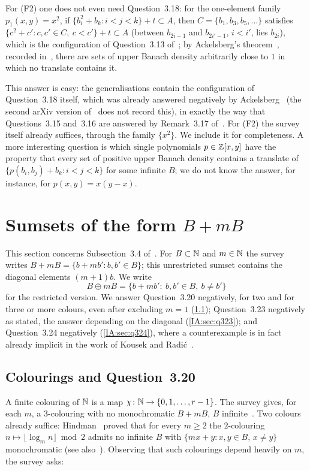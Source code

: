 For (F2) one does not even need Question~3.18: for the one-element family $p_1(x,y)=x^2$, if
$\{b_i^2+b_k:i<j<k\}+t\subset A$, then $C=\{b_1,b_3,b_5,\dots\}$ satisfies
$\{c^2+c':c,c'\in C,\ c<c'\}+t\subset A$ (between $b_{2i-1}$ and $b_{2i'-1}$, $i<i'$, lies $b_{2i}$),
which is the configuration of Question~3.13 of~\cite{kra2023problems}; by Ackelsberg's
theorem~\cite[Theorem~1.5]{ackelsberg2024counterexamples}, recorded in~\cite{kra2023problems},
there are sets of upper Banach density arbitrarily close to $1$ in which no translate contains it.

\begin{remark}\label{IA:rem:u33e}
This answer is easy: the generalisations contain the configuration of Question~3.18 itself, which
was already answered negatively by Ackelsberg~\cite[Theorem~1.7]{ackelsberg2024counterexamples}
(the second arXiv version of~\cite{kra2023problems} does not record this), in exactly the way that
Questions~3.15 and~3.16 are answered by Remark~3.17 of~\cite{kra2023problems}. For (F2) the survey
itself already suffices, through the family $\{x^2\}$. We include it for completeness. A more
interesting question is which single polynomials $p\in\mathbb{Z}[x,y]$ have the property that every set of
positive upper Banach density contains a translate of $\{p(b_i,b_j)+b_k:i<j<k\}$ for some infinite $B$;
we do not know the answer, for instance, for $p(x,y)=x(y-x)$.
\end{remark}


\section{Sumsets of the form \texorpdfstring{$B+mB$}{B+mB}}\label{IA:sec:BmB}

This section concerns Subsection~3.4 of~\cite{kra2023problems}. For $B\subset\mathbb{N}$ and $m\in\mathbb{N}$ the
survey writes $B+mB=\{b+mb':b,b'\in B\}$; this unrestricted sumset contains the diagonal elements
$(m+1)b$. We write
\[
B\oplus mB=\{b+mb':\ b,b'\in B,\ b\ne b'\}
\]
for the restricted version. We answer Question~3.20 negatively, for two and for three or more
colours, even after excluding $m=1$ (\cref{IA:sec:q320}); Question~3.23 negatively as stated, the
answer depending on the diagonal (\cref{IA:sec:q323}); and Question~3.24 negatively
(\cref{IA:sec:q324}), where a counterexample is in fact already implicit in the work of Kousek and
Radi\'c~\cite{kousek2024infinite}.

\subsection{Colourings and Question~3.20}\label{IA:sec:q320}
A finite colouring of $\mathbb{N}$ is a map $\chi\colon\mathbb{N}\to\{0,1,\dots,r-1\}$. The survey gives, for each
$m$, a $3$-colouring with no monochromatic $B+mB$, $B$ infinite~\cite[Example~3.9]{kra2023problems}.
Two colours already suffice: Hindman~\cite[Theorem~2.11]{hindman1979partitions} proved that for every
$m\ge2$ the $2$-colouring $n\mapsto\lfloor\log_mn\rfloor\bmod2$ admits no infinite $B$ with
$\{mx+y:x,y\in B,\,x\ne y\}$ monochromatic (see also~\cite[Remark~1.5]{huang2026affirmative}).
Observing that such colourings depend heavily on $m$, the survey asks:

